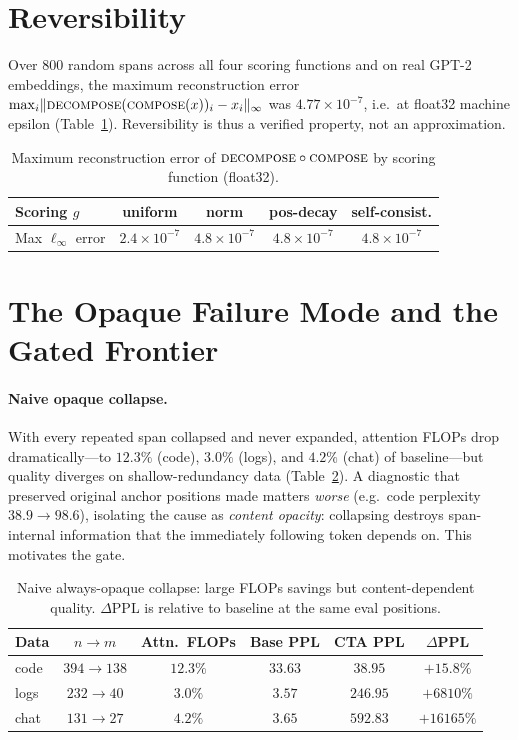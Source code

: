 \documentclass[11pt]{article}
\newcommand{\compose}{\textsc{compose}}
\newcommand{\decompose}{\textsc{decompose}}
\begin{document}
\section{Reversibility}
\label{sec:reversibility}

Over $800$ random spans across all four scoring functions and on real GPT-2 embeddings,
the maximum reconstruction error $\max_i\lVert\decompose(\compose(x))_i - x_i\rVert_\infty$
was $4.77\times10^{-7}$, i.e.\ at float32 machine epsilon (Table~\ref{tab:reversibility}).
Reversibility is thus a verified property, not an approximation.

\begin{table}[h]
\centering
\caption{Maximum reconstruction error of $\decompose\circ\compose$ by scoring function
(float32).}
\label{tab:reversibility}
\small
\begin{tabular}{lcccc}
\toprule
Scoring $g$ & uniform & norm & pos-decay & self-consist. \\
\midrule
Max $\ell_\infty$ error & $2.4\times10^{-7}$ & $4.8\times10^{-7}$ & $4.8\times10^{-7}$ & $4.8\times10^{-7}$ \\
\bottomrule
\end{tabular}
\end{table}

\section{The Opaque Failure Mode and the Gated Frontier}
\label{sec:frontier}

\paragraph{Naive opaque collapse.} With every repeated span collapsed and never expanded,
attention FLOPs drop dramatically---to $12.3\%$ (code), $3.0\%$ (logs), and $4.2\%$
(chat) of baseline---but quality diverges on shallow-redundancy data
(Table~\ref{tab:opaque}). A diagnostic that preserved original anchor positions made
matters \emph{worse} (e.g.\ code perplexity $38.9\to98.6$), isolating the cause as
\emph{content opacity}: collapsing destroys span-internal information that the immediately
following token depends on. This motivates the gate.

\begin{table}[h]
\centering
\caption{Naive always-opaque collapse: large FLOPs savings but content-dependent quality.
$\Delta$PPL is relative to baseline at the same eval positions.}
\label{tab:opaque}
\small
\begin{tabular}{lccccc}
\toprule
Data & $n\!\to\!m$ & Attn.\ FLOPs & Base PPL & CTA PPL & $\Delta$PPL \\
\midrule
code & $394\!\to\!138$ & $12.3\%$ & $33.63$ & $38.95$ & $+15.8\%$ \\
logs & $232\!\to\!40$  & $3.0\%$  & $3.57$  & $246.95$ & $+6810\%$ \\
chat & $131\!\to\!27$  & $4.2\%$  & $3.65$  & $592.83$ & $+16165\%$ \\
\bottomrule
\end{tabular}
\end{table}
\end{document}
